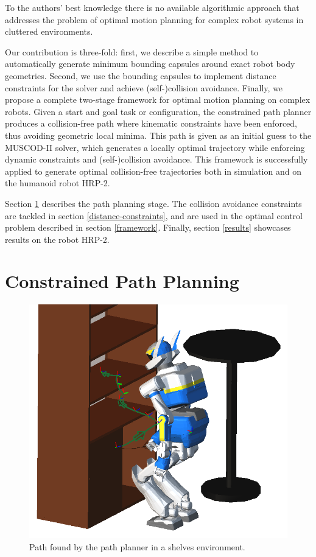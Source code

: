 To the authors' best knowledge there is no available algorithmic
approach that addresses the problem of optimal motion planning for
complex robot systems in cluttered environments.

Our contribution is three-fold: first, we describe a simple method to
automatically generate minimum bounding capsules around exact robot
body geometries. Second, we use the bounding capsules to implement
distance constraints for the solver and achieve (self-)collision
avoidance. Finally, we propose a complete two-stage framework for
optimal motion planning on complex robots. Given a start and goal task
or configuration, the constrained path planner produces a
collision-free path where kinematic constraints have been enforced,
thus avoiding geometric local minima. This path is given as an initial
guess to the \textsc{MUSCOD-II} solver, which generates a locally
optimal trajectory while enforcing dynamic constraints and
(self-)collision avoidance. This framework is successfully applied to
generate optimal collision-free trajectories both in simulation and on
the humanoid robot HRP-2.

Section \ref{path-planning} describes the path planning stage. The
collision avoidance constraints are tackled in section
\ref{distance-constraints}, and are used in the optimal control
problem described in section \ref{framework}. Finally, section
\ref{results} showcases results on the robot HRP-2.

\section{Constrained Path Planning}
\label{path-planning}

\begin{figure}
\centering
\includegraphics[width=0.8\linewidth]
                {src/chap3-optimal-motion-planning/figure/shelves-path.png}
\caption{Path found by the path planner in a shelves environment.}
\label{path}
\end{figure}

